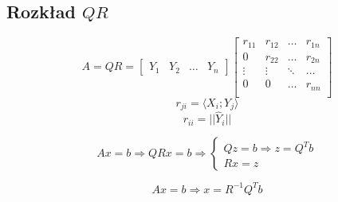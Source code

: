 \documentclass[../mn-notatki.tex]{subfiles}
\begin{document}
\subsection{Rozkład $QR$}
\begin{tcolorbox}
\[
A = QR = %
\begin{bmatrix}
Y_1 & Y_2 & \ldots & Y_n
\end{bmatrix}
\begin{bmatrix}
r_{11} & r_{12} & \ldots & r_{1n}\\
0      & r_{22} & \ldots & r_{2n}\\
\vdots & \vdots & \ddots & \ldots\\
0      & 0      & \ldots & r_{nn}\\
\end{bmatrix}
\]
\[
r_{ji} = \langle X_i; Y_j \rangle
\]
\[
r_{ii} = ||\hat{Y}_i||
\]
\end{tcolorbox}
\begin{tcolorbox}
\[
Ax = b \Rightarrow QRx = b \Rightarrow \begin{cases}
Qz = b \Rightarrow z = Q^T b\\
Rx = z
\end{cases}
\]
\end{tcolorbox}

\begin{tcolorbox}
\[
Ax = b \Rightarrow x = R^{-1}Q^T b
\]
\end{tcolorbox}

\pagebreak
\end{document}
